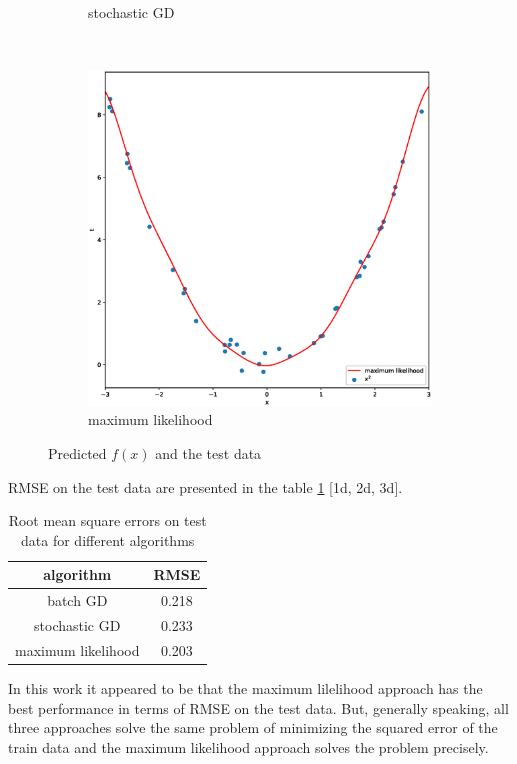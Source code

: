 \documentclass{article}
\begin{document}
\begin{figure}[t!]
\begin{subfigure}[b]{0.3\textwidth}
        \caption{stochastic GD}
    \end{subfigure}
    ~
    \begin{subfigure}[b]{0.3\textwidth}
        \centering
        \includegraphics[width = \linewidth]{lkl_final.eps}
        \caption{maximum likelihood}
    \end{subfigure}
    \caption{Predicted $f(x)$ and the test data}
    \label{predicted_func}
\end{figure}

RMSE on the test data are presented in the table \ref{RMSE} [1d, 2d, 3d].

\begin{table}
\centering
	\caption{Root mean square errors on test data for different algorithms}
	\label{RMSE}
	\begin{tabular}{|c|c|}
	\hline
	algorithm & RMSE \\
	\hline
	batch GD & 0.218 \\
	\hline
	stochastic GD & 0.233 \\
	\hline
	maximum likelihood & 0.203 \\
	\hline
	\end{tabular}
\end{table}

In this work it appeared to be that the maximum lilelihood approach has the best performance in terms of RMSE on the test data. But, generally speaking, all three approaches solve the same problem of minimizing the squared error of the train data and the maximum likelihood approach solves the problem precisely.
\end{document}
